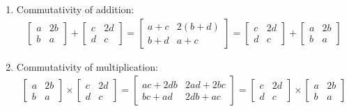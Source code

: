 \documentclass[11pt]{article}
\begin{document}
\begin{enumerate}
\item Commutativity of addition:
\begin{align*}
  \begin{bmatrix}
    a & 2b \\
    b & a
  \end{bmatrix} + 
  \begin{bmatrix}
    c & 2d \\
    d & c
  \end{bmatrix} =
  \begin{bmatrix}
    a + c & 2(b + d) \\
    b + d & a + c
  \end{bmatrix} = 
  \begin{bmatrix}
    c & 2d \\
    d & c
  \end{bmatrix} + 
  \begin{bmatrix}
    a & 2b \\
    b & a
  \end{bmatrix}
\end{align*}

\item Commutativity of multiplication:
\begin{align*}
  \begin{bmatrix}
    a & 2b \\
    b & a
  \end{bmatrix} \times
  \begin{bmatrix}
    c & 2d \\
    d & c
  \end{bmatrix} =
  \begin{bmatrix}
    ac + 2db & 2ad + 2bc \\
    bc + ad & 2db + ac
  \end{bmatrix} = 
  \begin{bmatrix}
    c & 2d \\
    d & c
  \end{bmatrix} \times
  \begin{bmatrix}
    a & 2b \\
    b & a
  \end{bmatrix}
\end{align*}


\end{enumerate}
\end{document}
